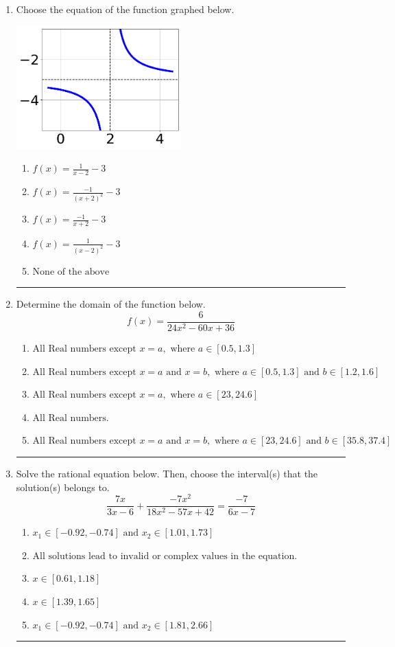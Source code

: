 \documentclass[14pt]{extbook}
\newcommand{\litem}[1]{\item#1\hspace*{-1cm}\rule{\textwidth}{0.4pt}}
\begin{document}
\begin{enumerate}
\litem{
Choose the equation of the function graphed below.
\begin{center}
    \includegraphics[width=0.5\textwidth]{../Figures/rationalGraphToEquationC.png}
\end{center}
\begin{enumerate}[label=\Alph*.]
\item \( f(x) = \frac{1}{x - 2} - 3 \)
\item \( f(x) = \frac{-1}{(x + 2)^2} - 3 \)
\item \( f(x) = \frac{-1}{x + 2} - 3 \)
\item \( f(x) = \frac{1}{(x - 2)^2} - 3 \)
\item \( \text{None of the above} \)

\end{enumerate} }
\litem{
Determine the domain of the function below.\[ f(x) = \frac{6}{24x^{2} -60 x + 36} \]\begin{enumerate}[label=\Alph*.]
\item \( \text{All Real numbers except } x = a, \text{ where } a \in [0.5, 1.3] \)
\item \( \text{All Real numbers except } x = a \text{ and } x = b, \text{ where } a \in [0.5, 1.3] \text{ and } b \in [1.2, 1.6] \)
\item \( \text{All Real numbers except } x = a, \text{ where } a \in [23, 24.6] \)
\item \( \text{All Real numbers.} \)
\item \( \text{All Real numbers except } x = a \text{ and } x = b, \text{ where } a \in [23, 24.6] \text{ and } b \in [35.8, 37.4] \)

\end{enumerate} }
\litem{
Solve the rational equation below. Then, choose the interval(s) that the solution(s) belongs to.\[ \frac{7x}{3x -6} + \frac{-7x^{2}}{18x^{2} -57 x + 42} = \frac{-7}{6x -7} \]\begin{enumerate}[label=\Alph*.]
\item \( x_1 \in [-0.92, -0.74] \text{ and } x_2 \in [1.01,1.73] \)
\item \( \text{All solutions lead to invalid or complex values in the equation.} \)
\item \( x \in [0.61,1.18] \)
\item \( x \in [1.39,1.65] \)
\item \( x_1 \in [-0.92, -0.74] \text{ and } x_2 \in [1.81,2.66] \)


\end{enumerate}}
\end{enumerate}
\end{document}
